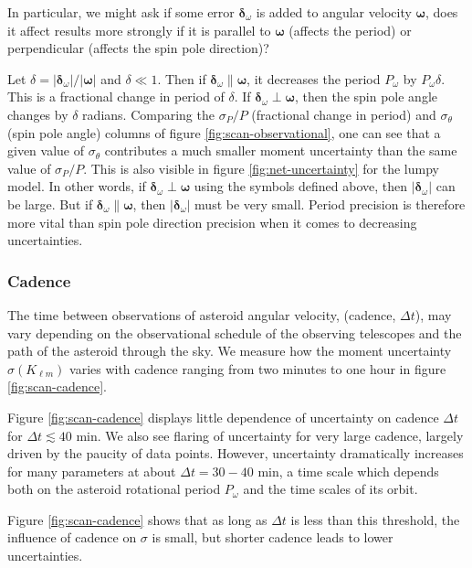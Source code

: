 \documentclass[fleqn,usenatbib]{mnras}
\begin{document}
In particular, we might ask if some error $\bm {\delta}_\omega$ is added to angular velocity $\bm \omega$, does it affect results more strongly if it is parallel to $\bm \omega$ (affects the period) or perpendicular (affects the spin pole direction)?

Let $\delta = |\bm{\delta}_\omega| / |\bm \omega|$ and $\delta \ll 1$. Then if $\bm {\delta}_\omega \parallel \bm \omega$, it decreases the period $P_\omega$ by $P_\omega \delta$. This is a fractional change in period of $\delta$. If $\bm {\delta}_\omega \perp \bm \omega$, then the spin pole angle changes by $\delta$ radians. Comparing the $\sigma_P / P$ (fractional change in period) and $\sigma_\theta$ (spin pole angle) columns of figure \ref{fig:scan-observational}, one can see that a given value of $\sigma_\theta$ contributes a much smaller moment uncertainty than the same value of $\sigma_P/ P$. This is also visible in figure \ref{fig:net-uncertainty} for the lumpy model. In other words, if $\bm {\delta}_\omega \perp \bm \omega$ using the symbols defined above, then $|\bm {\delta}_\omega|$ can be large. But if $\bm{\delta}_\omega  \parallel \bm \omega$, then $|\bm {\delta}_\omega|$ must be very small. Period precision is therefore more vital than spin pole direction precision when it comes to decreasing uncertainties.


\subsubsection{Cadence}
\label{sec:scan-cadence}

The time between observations of asteroid angular velocity, (cadence, $\Delta t$), may vary depending on the observational schedule of the observing telescopes and the path of the asteroid through the sky.  We measure how the moment uncertainty $\sigma(K_{\ell m})$ varies with cadence ranging from two minutes to one hour in figure \ref{fig:scan-cadence}.

Figure \ref{fig:scan-cadence} displays little dependence of uncertainty on cadence $\Delta t$ for $\Delta t \lesssim 40$ min. We also see flaring of uncertainty for very large cadence, largely driven by the paucity of data points. However, uncertainty dramatically increases for many parameters at about $\Delta t = 30-40$ min, a time scale which depends both on the asteroid rotational period $P_\omega$ and the time scales of its orbit.

Figure \ref{fig:scan-cadence} shows that as long as $\Delta t$ is less than this threshold, the influence of cadence on $\sigma$ is small, but shorter cadence leads to lower uncertainties.
\end{document}
